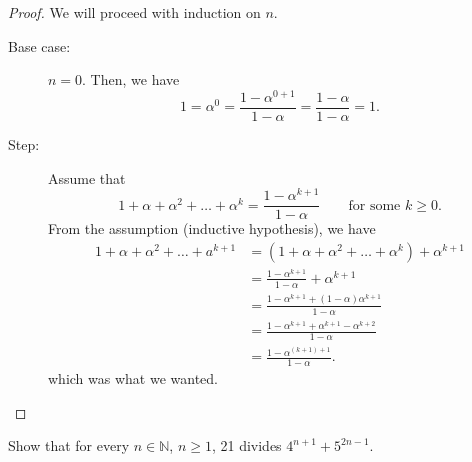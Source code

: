 \documentclass[a4paper]{article}
\begin{document}
\begin{proof}
	We will proceed with induction on \( n \).
	\begin{description}
		\item[Base case:] \( n = 0 \). Then, we have \[
			1 = \alpha ^0 = \frac{1-\alpha ^{0+1}}{1-\alpha } = \frac{1-\alpha }{1-\alpha } = 1
		.\] 
		\item[Step:] Assume that \[
			1 + \alpha  + \alpha ^2 + \ldots  + \alpha ^k = \frac{1-\alpha ^{k+1}}{1-\alpha } \qquad \text{for some } k \ge 0
		.\] From the assumption (inductive hypothesis), we have 
		\begin{align*}
			1 + \alpha  + \alpha ^2 + \ldots  + a^{k+1} &= (1 + \alpha  + \alpha^2 + \ldots  + \alpha ^k) + \alpha^{k+1} \\
																									&= \frac{1-\alpha ^{k+1}}{1-\alpha } + \alpha ^{k+1} \\
																									&= \frac{1-\alpha ^{k+1} + (1-\alpha )\alpha ^{k+1}}{1-\alpha } \\
																									&= \frac{1-\alpha ^{k+1} + \alpha ^{k+1} - \alpha ^{k+2}}{1-\alpha } \\
																									&= \frac{1-\alpha ^{(k+1) + 1}}{1-\alpha }
		.\end{align*}
		which was what we wanted.
	\end{description}
\end{proof}

\begin{eg}
	Show that for every \( n \in \mathbb{N} \), \( n \ge 1 \), 21 divides \( 4^{n+1} + 5^{2n-1} \).
\end{eg}
\end{document}
